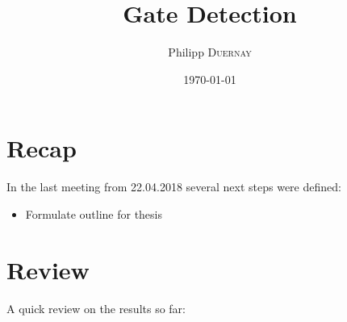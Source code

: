 \documentclass{article}
\title{Gate Detection} %
\author{Philipp \textsc{Duernay}} %
\date{\today} %
\begin{document}
\maketitle


\section{Recap}
In the last meeting from 22.04.2018 several next steps were defined:
\begin{itemize}
	\item Formulate outline for thesis
\end{itemize}


\section{Review}

A quick review on the results so far:
\end{document}
